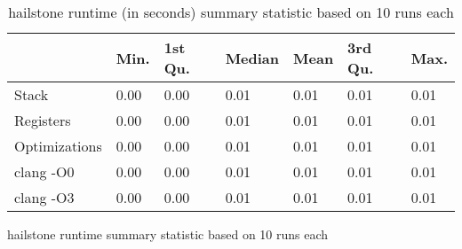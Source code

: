 \begin{table}[h!]
\centering
\begin{tabular}{p{}p{}p{}p{}p{}p{}p{}}
  \hline
 & Min. & 1st Qu. & Median & Mean & 3rd Qu. & Max. \\ 
  \hline
Stack & 0.00 & 0.00 & 0.01 & 0.01 & 0.01 & 0.01 \\ 
  Registers & 0.00 & 0.00 & 0.01 & 0.01 & 0.01 & 0.01 \\ 
  Optimizations & 0.00 & 0.00 & 0.01 & 0.01 & 0.01 & 0.01 \\ 
  clang -O0 & 0.00 & 0.00 & 0.01 & 0.01 & 0.01 & 0.01 \\ 
  clang -O3 & 0.00 & 0.00 & 0.01 & 0.01 & 0.01 & 0.01 \\ 
   \hline
\end{tabular}
\caption{hailstone runtime summary statistic based on 10 runs each}
\caption{hailstone runtime (in seconds) summary statistic based on 10 runs each}
\end{table}
